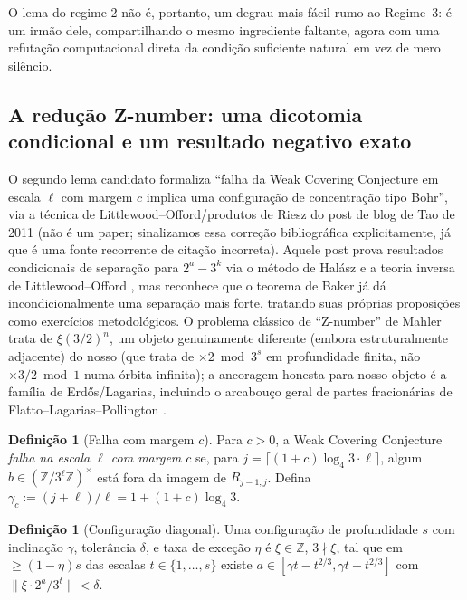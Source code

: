 \documentclass[11pt]{article}
\theoremstyle{definition}
\newtheorem{definition}[theorem]{Definição}
\theoremstyle{remark}
\newcommand{\ZZ}{\mathbb{Z}}
\begin{document}
O lema do regime 2 não é, portanto, um degrau mais fácil rumo ao
Regime~3: é um irmão dele, compartilhando o mesmo ingrediente
faltante, agora com uma refutação computacional direta da condição
suficiente natural em vez de mero silêncio.

\subsection{A redução Z-number: uma dicotomia condicional e um
resultado negativo exato}

O segundo lema candidato formaliza ``falha da Weak Covering Conjecture
em escala $\ell$ com margem $c$ implica uma configuração de
concentração tipo Bohr'', via a técnica de
Littlewood--Offord/produtos de Riesz do post de blog de Tao de 2011
\cite{Tao2011} (não é um paper; sinalizamos essa correção
bibliográfica explicitamente, já que é uma fonte recorrente de
citação incorreta). Aquele post prova resultados condicionais de
separação para $2^a-3^k$ via o método de Halász \cite{Halasz1977} e a
teoria inversa de Littlewood--Offord \cite{TaoVu2009,NguyenVu2011},
mas reconhece que o teorema de Baker já dá incondicionalmente uma
separação mais forte, tratando suas próprias proposições como
exercícios metodológicos. O problema clássico de ``Z-number'' de
Mahler \cite{Mahler1968} trata de $\xi(3/2)^n$, um objeto genuinamente
diferente (embora estruturalmente adjacente) do nosso (que trata de
$\times 2\bmod 3^s$ em profundidade finita, não $\times 3/2\bmod 1$
numa órbita infinita); a ancoragem honesta para nosso objeto é a
família de Erdős/Lagarias, incluindo o arcabouço geral de partes
fracionárias de Flatto--Lagarias--Pollington
\cite{Erdos1979,Lagarias2009,FlattoLagariasPollington1995}.

\begin{definition}[Falha com margem $c$]
Para $c>0$, a Weak Covering Conjecture \emph{falha na escala $\ell$
com margem $c$} se, para $j=\lceil(1+c)\log_4 3\cdot\ell\rceil$, algum
$b\in(\mathbb{Z}/3^\ell\mathbb{Z})^\times$ está fora da imagem de
$R_{j-1,j}$. Defina $\gamma_c := (j+\ell)/\ell = 1+(1+c)\log_4 3$.
\end{definition}

\begin{definition}[Configuração diagonal]
Uma configuração de profundidade $s$ com inclinação $\gamma$,
tolerância $\delta$, e taxa de exceção $\eta$ é $\xi\in\ZZ$,
$3\nmid\xi$, tal que em $\ge(1-\eta)s$ das escalas $t\in\{1,\dots,s\}$
existe $a\in[\gamma t - t^{2/3}, \gamma t+t^{2/3}]$ com
$\|\xi\cdot 2^a/3^t\|<\delta$.
\end{definition}
\end{document}
